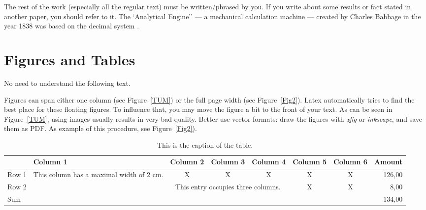 \documentclass[A4,10pt]{article}
\begin{document}
The rest of the work (especially all the regular text) must be
written/phrased by you. If you write about some results or fact
stated in another paper, you should refer to it.
The `Analytical Engine'' --- a mechanical calculation machine ---
created by Charles Babbage in the year 1838 was based on the decimal
system
\cite{Brom98}.

\section{Figures and Tables}

No need to understand the following text.

Figures can span either one column (see Figure~\ref{TUM}) or the full
page width (see Figure~\ref{Fig2}).
Latex automatically tries to find the best place for these floating
figures. To influence that, you may move the figure a bit to the front
of your text.
As can be seen in Figure~\ref{TUM}, using images usually results in very
bad quality. Better use vector formats: draw the figures with
{\em xfig} or {\em inkscape}, and save them as PDF. As example of
this procedure, see Figure~\ref{Fig2}).

\begin{table}

\begin{center}
\begin{tabular}{|l|p{2cm}|c|c|c|c|c|r|}
\hline
	& Column 1 & Column 2 & Column 3 & Column 4& Column 5& Column 6& 
Amount\\
\hline
Row 1 & This column has a maximal width of 2 cm.& X & X& X& X& X& 126,00\\
\hline
Row 2 & & \multicolumn{3}{p{5cm}|}{This entry occupies three columns.}& X &X 
& 8,00\\
\hline
\multicolumn{7}{|l}{Sum} &134,00\\
\hline
\end{tabular}
\end{center}

\caption{This is the caption of the table.}
\label{Tab1}

\end{table}
\end{document}

